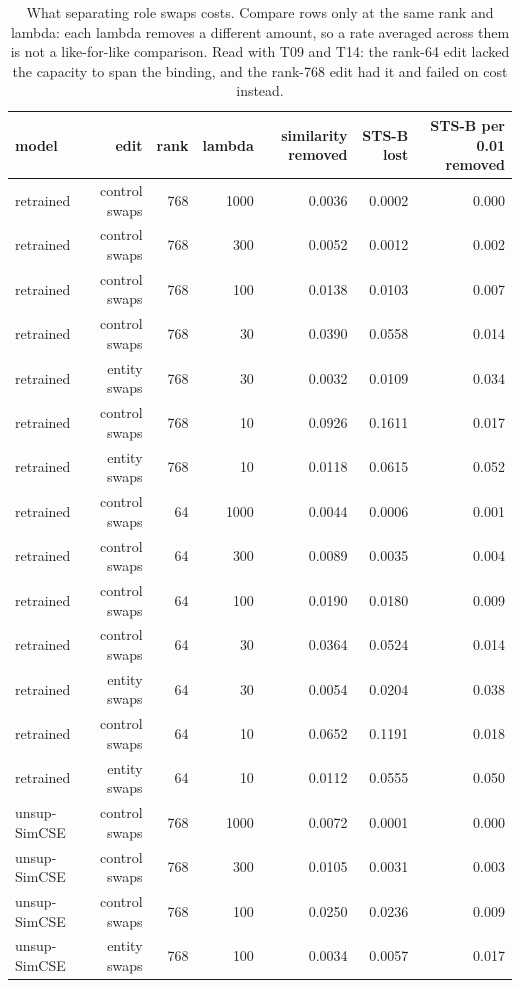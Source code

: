 \begin{table}[t]
\centering
\small
\caption{What separating role swaps costs. Compare rows only at the same rank and lambda: each lambda removes a different amount, so a rate averaged across them is not a like-for-like comparison. Read with T09 and T14: the rank-64 edit lacked the capacity to span the binding, and the rank-768 edit had it and failed on cost instead.}
\begin{tabular}{lrrrrrr}
\toprule
model & edit & rank & lambda & similarity removed & STS-B lost & STS-B per 0.01 removed \\
\midrule
retrained & control swaps & 768 & 1000 & 0.0036 & 0.0002 & 0.000 \\
retrained & control swaps & 768 & 300 & 0.0052 & 0.0012 & 0.002 \\
retrained & control swaps & 768 & 100 & 0.0138 & 0.0103 & 0.007 \\
retrained & control swaps & 768 & 30 & 0.0390 & 0.0558 & 0.014 \\
retrained & entity swaps & 768 & 30 & 0.0032 & 0.0109 & 0.034 \\
retrained & control swaps & 768 & 10 & 0.0926 & 0.1611 & 0.017 \\
retrained & entity swaps & 768 & 10 & 0.0118 & 0.0615 & 0.052 \\
retrained & control swaps & 64 & 1000 & 0.0044 & 0.0006 & 0.001 \\
retrained & control swaps & 64 & 300 & 0.0089 & 0.0035 & 0.004 \\
retrained & control swaps & 64 & 100 & 0.0190 & 0.0180 & 0.009 \\
retrained & control swaps & 64 & 30 & 0.0364 & 0.0524 & 0.014 \\
retrained & entity swaps & 64 & 30 & 0.0054 & 0.0204 & 0.038 \\
retrained & control swaps & 64 & 10 & 0.0652 & 0.1191 & 0.018 \\
retrained & entity swaps & 64 & 10 & 0.0112 & 0.0555 & 0.050 \\
unsup-SimCSE & control swaps & 768 & 1000 & 0.0072 & 0.0001 & 0.000 \\
unsup-SimCSE & control swaps & 768 & 300 & 0.0105 & 0.0031 & 0.003 \\
unsup-SimCSE & control swaps & 768 & 100 & 0.0250 & 0.0236 & 0.009 \\
unsup-SimCSE & entity swaps & 768 & 100 & 0.0034 & 0.0057 & 0.017 \\

\end{tabular}
\end{table}
